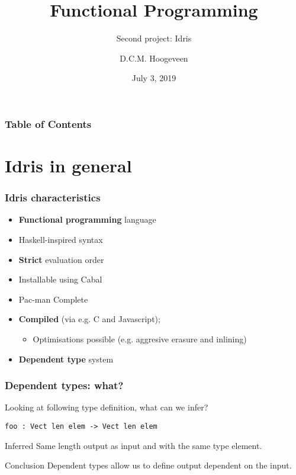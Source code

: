 \documentclass{beamer}
\title{Functional Programming}
\subtitle{Second project: Idris}
\author{D.C.M. Hoogeveen}
\institute{University of Twente}
\date{July 3, 2019}
\begin{document}
\frame{\titlepage} %

\begin{frame}
\frametitle{Table of Contents}
\tableofcontents
\end{frame}

\section{Idris in general}

\begin{frame} %
\frametitle{Idris characteristics}

\begin{itemize}
	\item \textbf{Functional programming} language
	\item Haskell-inspired syntax
	\item \textbf{Strict} evaluation order
	\item Installable using Cabal
	\item Pac-man Complete %
	\item \textbf{Compiled} (via e.g. C and Javascript); 
		\begin{itemize}
			\item Optimisations possible (e.g. aggresive erasure and inlining) %
		\end{itemize}
		
	\item \textbf{Dependent type} system
\end{itemize}
\end{frame}

\begin{frame}[fragile]
\frametitle{Dependent types: what?}


\begin{example}
	Looking at following type definition, what can we infer?
\end{example}

\begin{lstlisting}
foo : Vect len elem -> Vect len elem
\end{lstlisting}

\pause

\begin{block}{Inferred}
	Same length output as input and with the same type element. 
\end{block}

\pause

\begin{alertblock}{Conclusion}
	Dependent types allow us to define output dependent on the input.
\end{alertblock}

\end{frame}
\end{document}
